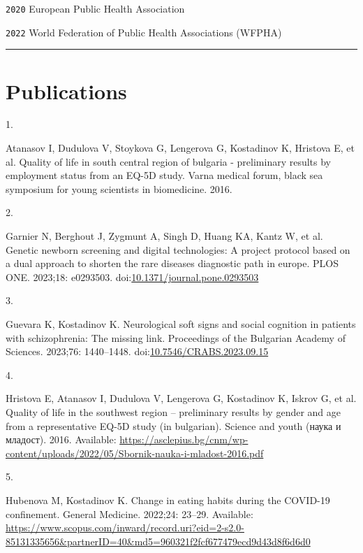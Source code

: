\documentclass[
  12pt,
  letterpaper,
  DIV=11,
  numbers=noendperiod]{scrartcl}
\newlength{\cslhangindent}
\newlength{\csllabelwidth}
\newenvironment{CSLReferences}[2] %
 {\begin{list}{}{%
  \setlength{\itemindent}{0pt}
  \setlength{\leftmargin}{0pt}
  \setlength{\parsep}{0pt}
  \ifodd #1
   \setlength{\leftmargin}{\cslhangindent}
   \setlength{\itemindent}{-1\cslhangindent}
  \fi
  \setlength{\itemsep}{#2\baselineskip}}}
 {\end{list}}
\newcommand{\CSLLeftMargin}[1]{\parbox[t]{\csllabelwidth}{\strut#1\strut}}
\newcommand{\CSLRightInline}[1]{\parbox[t]{\linewidth - \csllabelwidth}{\strut#1\strut}}
\begin{document}
\texttt{2020} European Public Health Association

\texttt{2022} World Federation of Public Health Associations (WFPHA)

\begin{center}\rule{0.5\linewidth}{0.5pt}\end{center}

\section{Publications}\label{publications}

\label{refs}
\begin{CSLReferences}{0}{1}
\nocite{*}

\CSLLeftMargin{1. }%
\CSLRightInline{Atanasov I, Dudulova V, Stoykova G, Lengerova G,
Kostadinov K, Hristova E, et al. Quality of life in south central region
of bulgaria - preliminary results by employment status from an EQ-5D
study. Varna medical forum, black sea symposium for young scientists in
biomedicine. 2016. }

\CSLLeftMargin{2. }%
\CSLRightInline{Garnier N, Berghout J, Zygmunt A, Singh D, Huang KA,
Kantz W, et al. Genetic newborn screening and digital technologies: A
project protocol based on a dual approach to shorten the rare diseases
diagnostic path in europe. PLOS ONE. 2023;18: e0293503.
doi:\href{https://doi.org/10.1371/journal.pone.0293503}{10.1371/journal.pone.0293503}}

\CSLLeftMargin{3. }%
\CSLRightInline{Guevara K, Kostadinov K. Neurological soft signs and
social cognition in patients with schizophrenia: The missing link.
Proceedings of the Bulgarian Academy of Sciences. 2023;76: 1440--1448.
doi:\href{https://doi.org/10.7546/CRABS.2023.09.15}{10.7546/CRABS.2023.09.15}}

\CSLLeftMargin{4. }%
\CSLRightInline{Hristova E, Atanasov I, Dudulova V, Lengerova G,
Kostadinov K, Iskrov G, et al. Quality of life in the southwest region
-- preliminary results by gender and age from a representative EQ-5D
study (in bulgarian). Science and youth (наука и младост). 2016.
Available:
\url{https://asclepius.bg/cnm/wp-content/uploads/2022/05/Sbornik-nauka-i-mladost-2016.pdf}}

\CSLLeftMargin{5. }%
\CSLRightInline{Hubenova M, Kostadinov K. Change in eating habits during
the COVID-19 confinement. General Medicine. 2022;24: 23--29. Available:
\url{https://www.scopus.com/inward/record.uri?eid=2-s2.0-85131335656&partnerID=40&md5=960321f2fcf677479ecd9d43d8f6d6d0}}


\end{CSLReferences}
\end{document}
